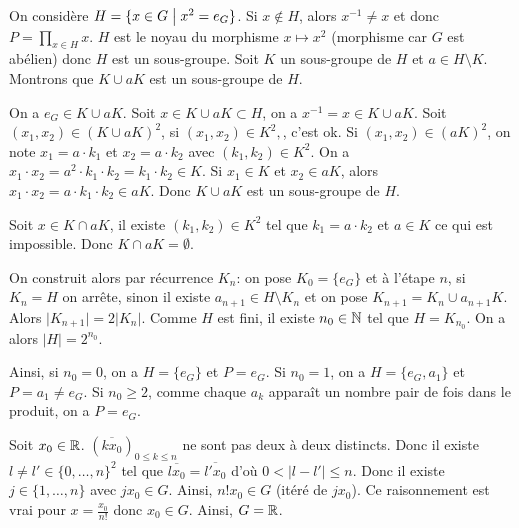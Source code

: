 \begin{solution}
	On considère $H=\{x\in G\bigm| x^{2}=e_{G}\}$. Si $x\notin H$, alors $x^{-1}\neq x$ et donc $P=\prod_{x\in H}x$. $H$ est le noyau du morphisme $x\mapsto x^{2}$ (morphisme car $G$ est abélien) donc $H$ est un sous-groupe. Soit $K$ un sous-groupe de $H$ et $a\in H\setminus K$. Montrons que $K\cup aK$ est un sous-groupe de $H$.
	
	On a $e_{G}\in K\cup aK$. Soit $x\in K\cup aK\subset H$, on a $x^{-1}=x\in K\cup aK$. Soit $(x_{1},x_{2})\in (K\cup aK)^{2}$, si $(x_{1},x_{2})\in K^{2},$, c'est ok. Si $(x_{1},x_{2})\in (aK)^{2}$, on note $x_{1}=a\cdot k_{1}$ et $x_{2}=a\cdot k_{2}$ avec $(k_{1},k_{2})\in K^{2}$. On a $x_{1}\cdot x_{2}=a^{2}\cdot k_{1}\cdot k_{2}=k_{1}\cdot k_{2}\in K$. Si $x_{1}\in K$ et $x_{2}\in aK$, alors $x_{1}\cdot x_{2}=a\cdot k_{1}\cdot k_{2}\in aK$. Donc $K\cup aK$ est un sous-groupe de $H$.

	Soit $x\in K\cap aK$, il existe $(k_{1},k_{2})\in K^{2}$ tel que $k_{1}=a\cdot k_{2}$ et $a\in K$ ce qui est impossible. Donc $K\cap aK=\emptyset$.

	On construit alors par récurrence $K_{n}$: on pose $K_{0}=\{e_{G}\}$ et à l'étape $n$, si $K_{n}=H$ on arrête, sinon il existe $a_{n+1}\in H\setminus K_{n}$ et on pose $K_{n+1}=K_{n}\cup a_{n+1}K$. Alors $\vert K_{n+1}\vert=2\vert K_{n}\vert$. Comme $H$ est fini, il existe $n_{0}\in\mathbb{N}$ tel que $H=K_{n_{0}}$. On a alors $\vert H\vert=2^{n_{0}}$.

	Ainsi, si $n_{0}=0$, on a $H=\{e_{G}\}$ et $P=e_{G}$. Si $n_{0}=1$, on a $H=\{e_{G},a_{1}\}$ et $P=a_{1}\neq e_{G}$. Si $n_{0}\geqslant 2$, comme chaque $a_{k}$ apparaît un nombre pair de fois dans le produit, on a $P=e_{G}$.
\end{solution}

\begin{solution}
	Soit $x_{0}\in\mathbb{R}$. $(\overline{kx_{0}})_{0\leqslant k\leqslant n}$ ne sont pas deux à deux distincts. Donc il existe $l\neq l'\in\{0,\dots,n\}^{2}$ tel que $\overline{lx_{0}}=\overline{l'x_{0}}$ d'où $0<\vert l-l'\vert\leqslant n$. Donc il existe $j\in\{1,\dots, n\}$ avec $jx_{0}\in G$. Ainsi, $n!x_{0}\in G$ (itéré de $jx_{0}$). Ce raisonnement est vrai pour $x=\frac{x_{0}}{n!}$ donc $x_{0}\in G$. Ainsi, $G=\mathbb{R}$.
\end{solution}

